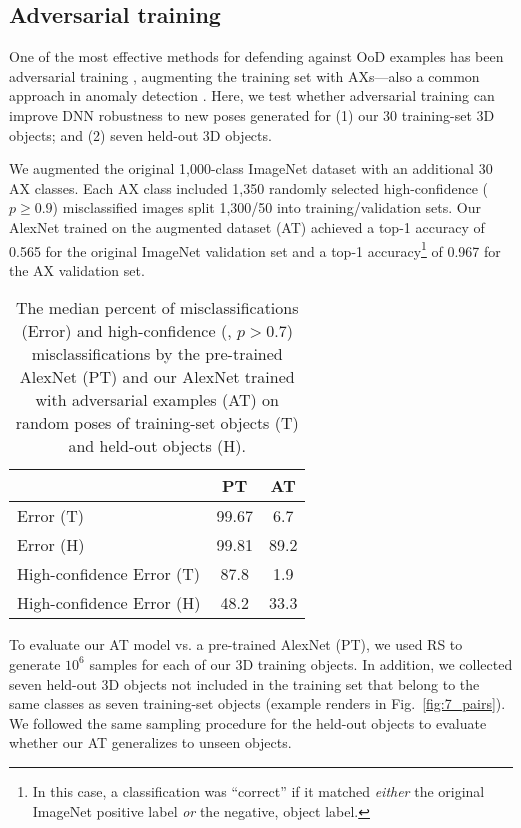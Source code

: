 \documentclass[10pt,twocolumn,letterpaper]{article}
\newcommand{\subsec}[1]{\noindent{\textbf{#1.}}}
\begin{document}
\subsection{Adversarial training}\label{sec:adversarial_training}

One of the most effective methods for defending against OoD examples has been adversarial training \cite{Goodfellow2014}, \ie augmenting the training set with AXs---also a common approach in anomaly detection \cite{chandola2009anomaly}.
Here, we test whether adversarial training can improve DNN robustness to new poses generated for (1) our 30 training-set 3D objects; and (2) seven held-out 3D objects.


\subsec{Training}
We augmented the original 1,000-class ImageNet dataset with an additional 30 AX classes.
Each AX class included 1,350 randomly selected high-confidence ($p \geq 0.9$) misclassified images split 1,300/50 into training/validation sets.
Our AlexNet trained on the augmented dataset (AT) achieved a top-1 accuracy of 0.565 for the original ImageNet validation set and a top-1 accuracy\footnote{In this case, a classification was ``correct'' if it matched \emph{either} the original ImageNet positive label \emph{or} the negative, object label.} of 0.967 for the AX validation set.






\begin{table}[h]
\begin{center}
  \begin{tabular}{lcc}
    \toprule
     & PT & AT \\
    \midrule
    Error (T) & 99.67 & 6.7 \\
    Error (H) & 99.81 & 89.2 \\
    \midrule
    High-confidence Error (T) & 87.8 & 1.9 \\        High-confidence Error (H) & 48.2 & 33.3 \\
    \bottomrule
\end{tabular}
\end{center}
\caption{The median percent of misclassifications (Error) and high-confidence (\ie, $p > 0.7$) misclassifications by the pre-trained AlexNet (PT) and our AlexNet trained with adversarial examples (AT) on random poses of training-set objects (T) and held-out objects (H).}
\label{tab:ax_stats}
\end{table}


\subsec{Evaluation} 
To evaluate our AT model vs. a pre-trained AlexNet (PT), we used RS to generate $10^6$ samples for each of our 3D training objects.
In addition, we collected seven held-out 3D objects not included in the training set that belong to the same classes as seven training-set objects (example renders in Fig.~\ref{fig:7_pairs}).
We followed the same sampling procedure for the held-out objects to evaluate whether our AT generalizes to unseen objects.
\end{document}
